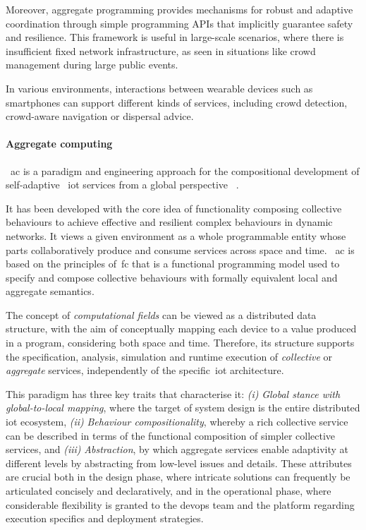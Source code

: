 Moreover, aggregate programming provides mechanisms for robust and adaptive coordination through simple programming APIs
that implicitly guarantee safety and resilience.
This framework is useful in large-scale scenarios, where there is insufficient fixed network infrastructure, as seen in
situations like crowd management during large public events.

In various environments, interactions between wearable devices such as smartphones can support different kinds of services,
including crowd detection, crowd-aware navigation or dispersal advice.

\paragraph{Aggregate computing}
~\ac{ac} is a paradigm and engineering approach for the compositional development of self-adaptive ~\ac{iot} services
from a global perspective ~\cite{10.1145/3579353}.

It has been developed with the core idea of functionality composing collective behaviours to achieve effective and resilient
complex behaviours in dynamic networks.
It views a given environment as a whole programmable entity whose parts collaboratively produce and consume services
across space and time.
~\ac{ac} is based on the principles of~\ac{fc} that is a functional programming model used to specify
and compose collective behaviours with formally equivalent local and aggregate semantics.

The concept of \emph{computational fields} can be viewed as a distributed data structure,
with the aim of conceptually mapping each device to a value produced in a program, considering both
space and time.
Therefore, its structure supports the specification, analysis, simulation and runtime execution of \emph{collective}
or \emph{aggregate} services, independently of the specific~\ac{iot} architecture.

This paradigm has three key traits that characterise it:
    \emph{(i)} \emph{Global stance with global-to-local mapping}, where the target of system design is the entire distributed
        \ac{iot} ecosystem,
    \emph{(ii)} \emph{Behaviour compositionality}, whereby a rich collective service can be described in terms of the functional
        composition of simpler collective services, and
    \emph{(iii)} \emph{Abstraction}, by which aggregate services enable adaptivity at different levels by abstracting from low-level
        issues and details.
These attributes are crucial both in the design phase, where intricate solutions can frequently be articulated concisely
and declaratively, and in the operational phase, where considerable flexibility is granted to the devops team and the
platform regarding execution specifics and deployment strategies.


